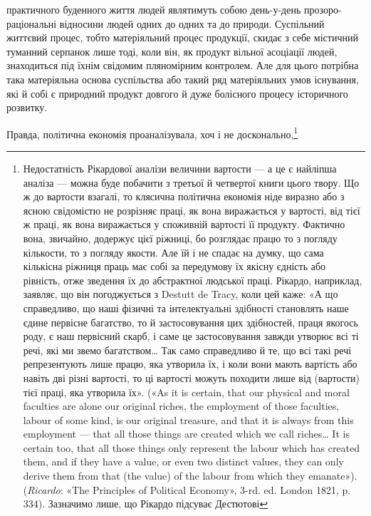 \parcont{}  %
практичного буденного життя людей являтимуть собою день-у-день прозоро-раціональні відносини людей
одних до одних та до природи. Суспільний життєвий процес, тобто матеріяльний процес продукції,
скидає з себе містичний туманний серпанок лише тоді, коли він, як продукт вільної асоціації людей,
знаходиться під
їхнім свідомим пляномірним контролем. Але для цього потрібна така матеріяльна основа суспільства або
такий ряд матеріяльних умов існування, які й собі є природний продукт довгого й дуже болісного
процесу історичного розвитку.

Правда, політична економія проаналізувала, хоч і не досконально,\footnote{
Недостатність Рікардової аналізи величини вартости — а це є найліпша аналіза — можна буде
побачити з третьої й четвертої книги цього твору. Що ж до вартости взагалі, то клясична політична
економія ніде виразно або з ясною свідомістю не розрізняє праці, як вона виражається у вартості, від
тієї ж праці, як вона виражається у споживній вартості її продукту. Фактично вона, звичайно,
додержує цієї ріжниці, бо розглядає працю то з погляду кількости, то з погляду якости. Але їй і не
спадає на думку, що сама кількісна ріжниця праць має собі за передумову їх якісну єдність або
рівність, отже зведення їх до абстрактної людської праці. Рікардо, наприклад, заявляє, що він
погоджується з Destutt de Tracy, коли цей каже: «А що справедливо, що наші фізичні та інтелектуальні
здібності становлять наше єдине первісне багатство, то й застосовування цих здібностей, праця
якогось роду, є наш первісний скарб, і саме це застосовування завжди утворює всі ті речі, які ми
звемо багатством\dots{} Так само справедливо й те, що всі такі речі репрезентують лише працю, яка
утворила їх, і коли вони мають вартість або навіть дві різні вартості, то ці вартості можуть
походити лише від (вартости) тієї праці, яка утворила їх». («As it is certain, that our physical and
moral faculties are alone our original riches, the employment of those faculties, labour of some
kind, is our original treasure, and that it is always from this employment — that all those things
are created which we call riches\dots{} It is certain too, that all those things only represent the
labour which has created them, and if they have a value, or even two distinct values, they can only
derive them from that (the value) of the labour from which they emanate»). (\emph{Ricardo}: «The Principles
of Political Economy», 3-rd. ed. London 1821, p. 334). Зазначимо лише, що Рікардо підсуває Дестютові
}
